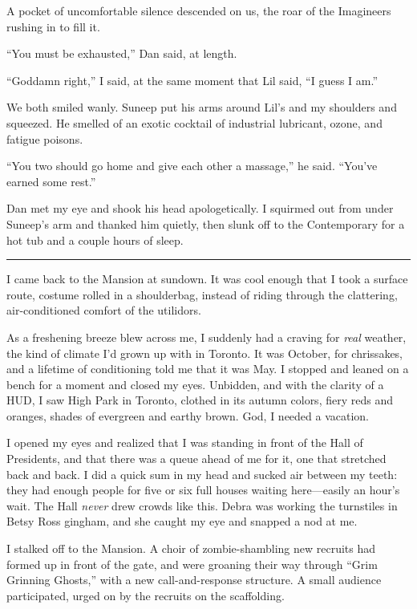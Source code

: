 A pocket of uncomfortable silence descended on us, the roar of the
Imagineers rushing in to fill it.

“You must be exhausted,” Dan said, at length.

“Goddamn right,” I said, at the same moment that Lil said, “I guess
I am.”

We both smiled wanly. Suneep put his arms around Lil's and my
shoulders and squeezed. He smelled of an exotic cocktail of
industrial lubricant, ozone, and fatigue poisons.

“You two should go home and give each other a massage,” he said.
“You've earned some rest.”

Dan met my eye and shook his head apologetically. I squirmed out
from under Suneep's arm and thanked him quietly, then slunk off to
the Contemporary for a hot tub and a couple hours of sleep.

\begin{center}\rule{3in}{0.4pt}\end{center}

I came back to the Mansion at sundown. It was cool enough that I
took a surface route, costume rolled in a shoulderbag, instead of
riding through the clattering, air-conditioned comfort of the
utilidors.

As a freshening breeze blew across me, I suddenly had a craving for
\emph{real} weather, the kind of climate I'd grown up with in
Toronto. It was October, for chrissakes, and a lifetime of
conditioning told me that it was May. I stopped and leaned on a
bench for a moment and closed my eyes. Unbidden, and with the
clarity of a HUD, I saw High Park in Toronto, clothed in its autumn
colors, fiery reds and oranges, shades of evergreen and earthy
brown. God, I needed a vacation.

I opened my eyes and realized that I was standing in front of the
Hall of Presidents, and that there was a queue ahead of me for it,
one that stretched back and back. I did a quick sum in my head and
sucked air between my teeth: they had enough people for five or six
full houses waiting here—easily an hour's wait. The Hall
\emph{never} drew crowds like this. Debra was working the
turnstiles in Betsy Ross gingham, and she caught my eye and snapped
a nod at me.

I stalked off to the Mansion. A choir of zombie-shambling new
recruits had formed up in front of the gate, and were groaning
their way through “Grim Grinning Ghosts,” with a new
call-and-response structure. A small audience participated, urged
on by the recruits on the scaffolding.

